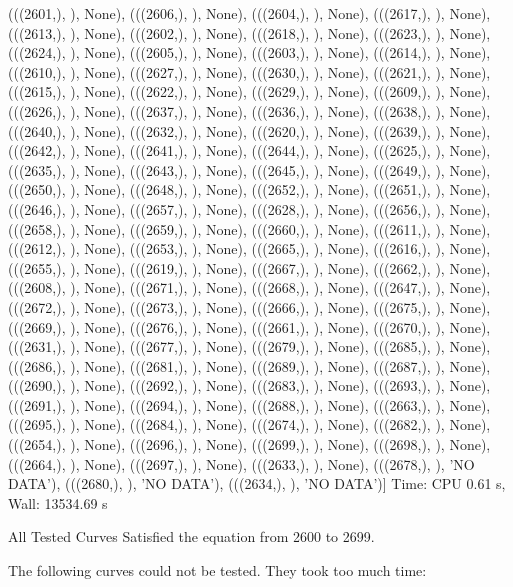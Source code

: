  (((2601,), {}), None),
 (((2606,), {}), None),
 (((2604,), {}), None),
 (((2617,), {}), None),
 (((2613,), {}), None),
 (((2602,), {}), None),
 (((2618,), {}), None),
 (((2623,), {}), None),
 (((2624,), {}), None),
 (((2605,), {}), None),
 (((2603,), {}), None),
 (((2614,), {}), None),
 (((2610,), {}), None),
 (((2627,), {}), None),
 (((2630,), {}), None),
 (((2621,), {}), None),
 (((2615,), {}), None),
 (((2622,), {}), None),
 (((2629,), {}), None),
 (((2609,), {}), None),
 (((2626,), {}), None),
 (((2637,), {}), None),
 (((2636,), {}), None),
 (((2638,), {}), None),
 (((2640,), {}), None),
 (((2632,), {}), None),
 (((2620,), {}), None),
 (((2639,), {}), None),
 (((2642,), {}), None),
 (((2641,), {}), None),
 (((2644,), {}), None),
 (((2625,), {}), None),
 (((2635,), {}), None),
 (((2643,), {}), None),
 (((2645,), {}), None),
 (((2649,), {}), None),
 (((2650,), {}), None),
 (((2648,), {}), None),
 (((2652,), {}), None),
 (((2651,), {}), None),
 (((2646,), {}), None),
 (((2657,), {}), None),
 (((2628,), {}), None),
 (((2656,), {}), None),
 (((2658,), {}), None),
 (((2659,), {}), None),
 (((2660,), {}), None),
 (((2611,), {}), None),
 (((2612,), {}), None),
 (((2653,), {}), None),
 (((2665,), {}), None),
 (((2616,), {}), None),
 (((2655,), {}), None),
 (((2619,), {}), None),
 (((2667,), {}), None),
 (((2662,), {}), None),
 (((2608,), {}), None),
 (((2671,), {}), None),
 (((2668,), {}), None),
 (((2647,), {}), None),
 (((2672,), {}), None),
 (((2673,), {}), None),
 (((2666,), {}), None),
 (((2675,), {}), None),
 (((2669,), {}), None),
 (((2676,), {}), None),
 (((2661,), {}), None),
 (((2670,), {}), None),
 (((2631,), {}), None),
 (((2677,), {}), None),
 (((2679,), {}), None),
 (((2685,), {}), None),
 (((2686,), {}), None),
 (((2681,), {}), None),
 (((2689,), {}), None),
 (((2687,), {}), None),
 (((2690,), {}), None),
 (((2692,), {}), None),
 (((2683,), {}), None),
 (((2693,), {}), None),
 (((2691,), {}), None),
 (((2694,), {}), None),
 (((2688,), {}), None),
 (((2663,), {}), None),
 (((2695,), {}), None),
 (((2684,), {}), None),
 (((2674,), {}), None),
 (((2682,), {}), None),
 (((2654,), {}), None),
 (((2696,), {}), None),
 (((2699,), {}), None),
 (((2698,), {}), None),
 (((2664,), {}), None),
 (((2697,), {}), None),
 (((2633,), {}), None),
 (((2678,), {}), 'NO DATA'),
 (((2680,), {}), 'NO DATA'),
 (((2634,), {}), 'NO DATA')]
Time: CPU 0.61 s, Wall: 13534.69 s

All Tested Curves Satisfied the equation from 2600 to 2699.

The following curves could not be tested.
They took too much time:

